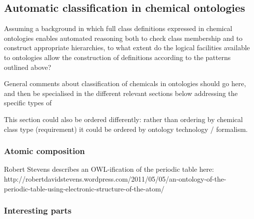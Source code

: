 \documentclass[10pt]{bmc_article}
\newenvironment{bmcformat}{\baselineskip20pt\sloppy\setboolean{publ}{false}}{\baselineskip20pt\sloppy}
\begin{document}
\begin{bmcformat}


\subsection*{Automatic classification in chemical ontologies}
\label{sec:resultschemontology}


Assuming a background in which full class definitions expressed in chemical ontologies enables automated reasoning both to check class membership and to construct appropriate hierarchies, to what extent do the logical facilities available to ontologies allow the construction of definitions according to the patterns outlined above? 

General comments about classification of chemicals in ontologies should go here, and then be specialised in the different relevant sections below addressing the specific types of 

This section could also be ordered differently: rather than ordering by chemical class type (requirement) it could be ordered by ontology technology / formalism. 

\subsubsection*{Atomic composition}

Robert Stevens describes an OWL-ification of the periodic table here: http://robertdavidstevens.wordpress.com/2011/05/05/an-ontology-of-the-periodic-table-using-electronic-structure-of-the-atom/



\subsubsection*{Interesting parts}


\end{bmcformat}
\end{document}
